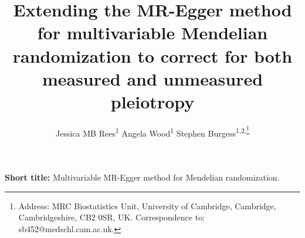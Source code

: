 \documentclass[a4paper,12pt]{article}
\begin{document}
\title{Extending the MR-Egger method for multivariable Mendelian randomization to correct for both measured and unmeasured pleiotropy}
\author{Jessica MB Rees\textsuperscript{1} \qquad Angela Wood\textsuperscript{1} \qquad Stephen Burgess\textsuperscript{1,2,\thanks{Address: MRC Biostatistics Unit, University of Cambridge, Cambridge, Cambridgeshire, CB2 0SR, UK. Correspondence to: sb452@medschl.cam.ac.uk.}}}
\maketitle
\noindent \textbf{Short title:} Multivariable MR-Egger method for Mendelian randomization.
\pagebreak
\end{document}
